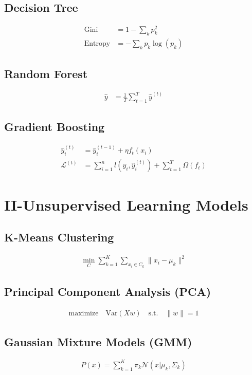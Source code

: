 \documentclass[a4paper,10pt]{article}
\begin{document}
\subsection*{Decision Tree}
\begin{align*}
\text{Gini} &= 1 - \sum_{k} p_k^2 \\
\text{Entropy} &= -\sum_{k} p_k \log(p_k)
\end{align*}

\subsection*{Random Forest}
\begin{align*}
\hat{y} &= \frac{1}{T} \sum_{t=1}^{T} \hat{y}^{(t)}
\end{align*}

\subsection*{Gradient Boosting}
\begin{align*}
\hat{y}_i^{(t)} &= \hat{y}_i^{(t-1)} + \eta f_t(x_i) \\
\mathcal{L}^{(t)} &= \sum_{i=1}^n l(y_i, \hat{y}_i^{(t)}) + \sum_{t=1}^T \Omega(f_t)
\end{align*}

\section*{II-Unsupervised Learning Models}

\subsection*{K-Means Clustering}
\begin{align*}
\min_{C} \sum_{k=1}^{K} \sum_{x_i \in C_k} \|x_i - \mu_k\|^2
\end{align*}

\subsection*{Principal Component Analysis (PCA)}
\begin{align*}
\text{maximize} \quad \text{Var}(Xw) \quad \text{s.t.} \quad \|w\| = 1
\end{align*}

\subsection*{Gaussian Mixture Models (GMM)}
\begin{align*}
P(x) = \sum_{k=1}^{K} \pi_k \mathcal{N}(x | \mu_k, \Sigma_k)
\end{align*}
\end{document}
